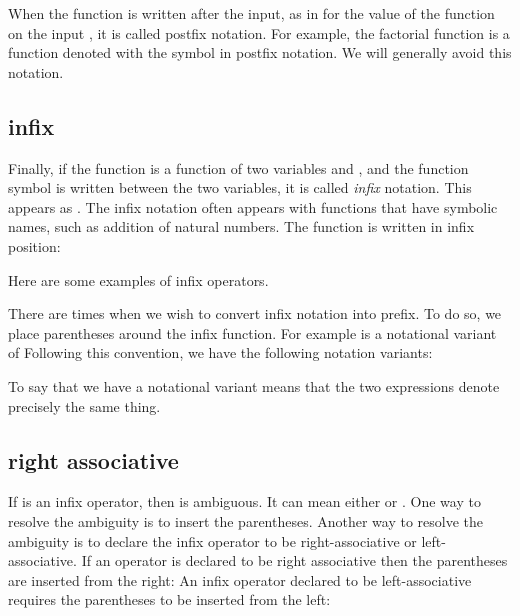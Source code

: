 \documentclass[cup9a]{cupbook}
\begin{document}
When the function is written after the input, as in  for the value of the function on the input , it is called postfix notation.  For example, the factorial function  is a function denoted with the symbol \mc{$!$} in postfix notation.   We will generally avoid this notation.

\subsection{infix}

Finally, if the function is a function of two variables  and , and the function symbol is written between the two variables, it is called {\it infix} notation.  This appears as .    The infix notation often appears with functions that have symbolic names, such as addition of natural numbers.  The function is written in infix position:

Here are some examples of infix operators.

There are times when we wish to convert infix notation into prefix.  To do so, we place parentheses around the infix function.   For example
is a notational variant of
Following this convention, we have the following notation variants:

To say that we have a notational variant means that the two expressions denote precisely the same thing.  


\subsection{right associative}

If \mc{$*$} is an infix operator, then  is ambiguous.  It can mean
either  or .  One way to resolve the ambiguity is to insert the parentheses.  Another way to resolve the ambiguity is to declare the infix operator to  be right-associative or left-associative.  If an operator is
declared to be right associative then the parentheses are inserted from the right:
An infix operator declared to be left-associative requires the parentheses to be inserted from the left:
\end{document}
